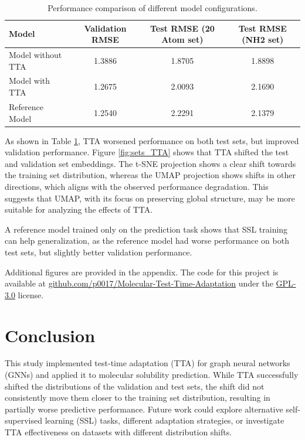 \documentclass[11pt,a4paper]{article}
\begin{document}
\begin{table}[htbp]
        \centering
        \begin{tabular}{@{}lccc@{}}
                \toprule
                \textbf{Model}    & \textbf{Validation RMSE} & \textbf{Test RMSE (20 Atom set)} & \textbf{Test RMSE (NH2 set)} \\
                \midrule
                Model without TTA & 1.3886                   & 1.8705                           & 1.8898                       \\
                Model with TTA    & 1.2675                   & 2.0093                           & 2.1690                       \\
                Reference Model   & 1.2540                   & 2.2291                           & 2.1379                       \\
                \bottomrule
        \end{tabular}
        \caption{Performance comparison of different model configurations.}
        \label{tab:results}
\end{table}

As shown in Table \ref{tab:results}, TTA worsened performance on both test sets, but improved validation performance. Figure \ref{fig:sets_TTA} shows that TTA shifted the test and validation set embeddings. The t-SNE projection shows a clear shift towards the training set distribution, whereas the UMAP projection shows shifts in other directions, which aligns with the observed performance degradation. This suggests that UMAP, with its focus on preserving global structure, may be more suitable for analyzing the effects of TTA.

A reference model trained only on the prediction task shows that SSL training can help generalization, as the reference model had worse performance on both test sets, but slightly better validation performance.

Additional figures are provided in the appendix. The code for this project is available at \href{https://github.com/p0017/Molecular-Test-Time-Adaptation}{github.com/p0017/Molecular-Test-Time-Adaptation} under the \href{https://www.gnu.org/licenses/gpl-3.0}{GPL-3.0} license.

\section{Conclusion}

This study implemented test-time adaptation (TTA) for graph neural networks (GNNs) and applied it to molecular solubility prediction. While TTA successfully shifted the distributions of the validation and test sets, the shift did not consistently move them closer to the training set distribution, resulting in partially worse predictive performance. Future work could explore alternative self-supervised learning (SSL) tasks, different adaptation strategies, or investigate TTA effectiveness on datasets with different distribution shifts.
\end{document}
